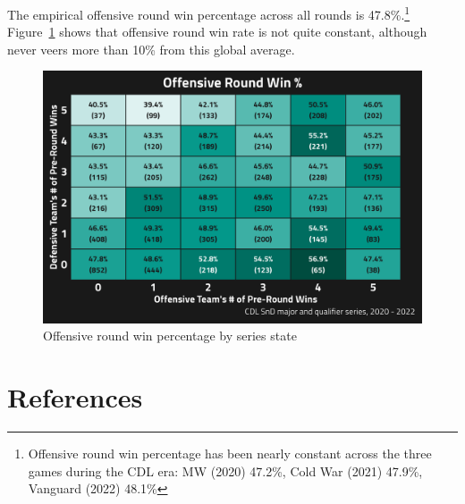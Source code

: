 \documentclass[
]{article}
\begin{document}
The empirical offensive round win percentage across all rounds is
47.8\%.\footnote{Offensive round win percentage has been nearly constant
  across the three games during the CDL era: MW (2020) 47.2\%, Cold War
  (2021) 47.9\%, Vanguard (2022) 48.1\%}
Figure~\ref{fig-cod-o-round-win-prop} shows that offensive round win
rate is not quite constant, although never veers more than 10\% from
this global average.

\begin{figure}

{\centering \includegraphics{images/cod_o_round_win_prop.png}

}

\caption{\label{fig-cod-o-round-win-prop}Offensive round win percentage
by series state}

\end{figure}

\hypertarget{references}{%
\section*{References}\label{references}}
\end{document}
